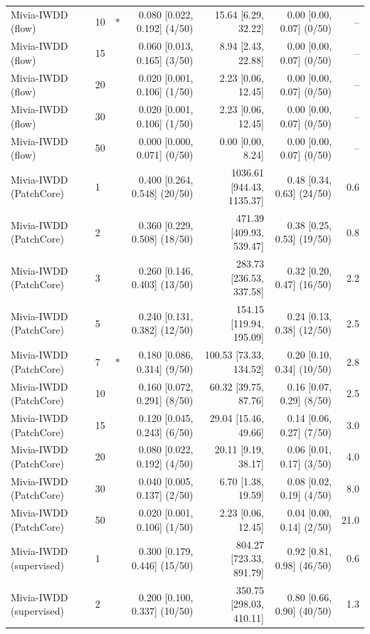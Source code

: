 \begin{table}[t]
{\begin{tabular}{llcrrrr}
Mivia-IWDD (flow) & 10 & $\ast$ & 0.080 [0.022, 0.192] (4/50) & 15.64 [6.29, 32.22] & 0.00 [0.00, 0.07] (0/50) & -- \\
Mivia-IWDD (flow) & 15 &  & 0.060 [0.013, 0.165] (3/50) & 8.94 [2.43, 22.88] & 0.00 [0.00, 0.07] (0/50) & -- \\
Mivia-IWDD (flow) & 20 &  & 0.020 [0.001, 0.106] (1/50) & 2.23 [0.06, 12.45] & 0.00 [0.00, 0.07] (0/50) & -- \\
Mivia-IWDD (flow) & 30 &  & 0.020 [0.001, 0.106] (1/50) & 2.23 [0.06, 12.45] & 0.00 [0.00, 0.07] (0/50) & -- \\
Mivia-IWDD (flow) & 50 &  & 0.000 [0.000, 0.071] (0/50) & 0.00 [0.00, 8.24] & 0.00 [0.00, 0.07] (0/50) & -- \\
Mivia-IWDD (PatchCore) & 1 &  & 0.400 [0.264, 0.548] (20/50) & 1036.61 [944.43, 1135.37] & 0.48 [0.34, 0.63] (24/50) & 0.6 \\
Mivia-IWDD (PatchCore) & 2 &  & 0.360 [0.229, 0.508] (18/50) & 471.39 [409.93, 539.47] & 0.38 [0.25, 0.53] (19/50) & 0.8 \\
Mivia-IWDD (PatchCore) & 3 &  & 0.260 [0.146, 0.403] (13/50) & 283.73 [236.53, 337.58] & 0.32 [0.20, 0.47] (16/50) & 2.2 \\
Mivia-IWDD (PatchCore) & 5 &  & 0.240 [0.131, 0.382] (12/50) & 154.15 [119.94, 195.09] & 0.24 [0.13, 0.38] (12/50) & 2.5 \\
Mivia-IWDD (PatchCore) & 7 & $\ast$ & 0.180 [0.086, 0.314] (9/50) & 100.53 [73.33, 134.52] & 0.20 [0.10, 0.34] (10/50) & 2.8 \\
Mivia-IWDD (PatchCore) & 10 &  & 0.160 [0.072, 0.291] (8/50) & 60.32 [39.75, 87.76] & 0.16 [0.07, 0.29] (8/50) & 2.5 \\
Mivia-IWDD (PatchCore) & 15 &  & 0.120 [0.045, 0.243] (6/50) & 29.04 [15.46, 49.66] & 0.14 [0.06, 0.27] (7/50) & 3.0 \\
Mivia-IWDD (PatchCore) & 20 &  & 0.080 [0.022, 0.192] (4/50) & 20.11 [9.19, 38.17] & 0.06 [0.01, 0.17] (3/50) & 4.0 \\
Mivia-IWDD (PatchCore) & 30 &  & 0.040 [0.005, 0.137] (2/50) & 6.70 [1.38, 19.59] & 0.08 [0.02, 0.19] (4/50) & 8.0 \\
Mivia-IWDD (PatchCore) & 50 &  & 0.020 [0.001, 0.106] (1/50) & 2.23 [0.06, 12.45] & 0.04 [0.00, 0.14] (2/50) & 21.0 \\
Mivia-IWDD (supervised) & 1 &  & 0.300 [0.179, 0.446] (15/50) & 804.27 [723.33, 891.79] & 0.92 [0.81, 0.98] (46/50) & 0.6 \\
Mivia-IWDD (supervised) & 2 &  & 0.200 [0.100, 0.337] (10/50) & 350.75 [298.03, 410.11] & 0.80 [0.66, 0.90] (40/50) & 1.3 \\

\end{tabular}}
\end{table}

